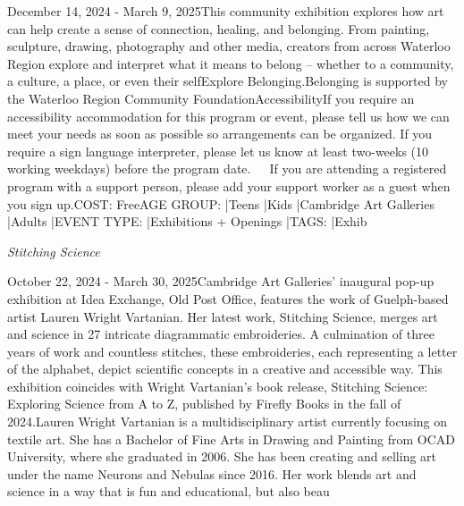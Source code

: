 \documentclass[letterpaper, 10pt]{article}
\newcommand{\subtitle}[1]{\textit{\large #1}\vspace{0.5em}}
\newcommand{\articlecontent}[1]{\small #1\vspace{1em}}
\begin{document}
\begin{multicols}{2}
{
\vspace{10px}

December 14, 2024 - March 9, 2025This community exhibition explores how art can help create a sense of connection, healing, and belonging. From painting, sculpture, drawing, photography and other media, creators from across Waterloo Region explore and interpret what it means to belong – whether to a community, a culture, a place, or even their selfExplore Belonging.Belonging is supported by the Waterloo Region Community FoundationAccessibilityIf you require an accessibility accommodation for this program or event, please tell us how we can meet your needs as soon as possible so arrangements can be organized. If you require a sign language interpreter, please let us know at least two-weeks (10 working weekdays) before the program date.   If you are attending a registered program with a support person, please add your support worker as a guest when you sign up.COST: FreeAGE GROUP: |Teens |Kids |Cambridge Art Galleries |Adults |EVENT TYPE: |Exhibitions + Openings |TAGS: |Exhib
}
\vspace{10px}

\subtitle{Stitching Science}

\articlecontent{

\qrcode[height=1.5cm]{https://ideaexchange.libnet.info/event/12110996}
\vspace{10px}

October 22, 2024 - March 30, 2025Cambridge Art Galleries' inaugural pop-up exhibition at Idea Exchange, Old Post Office, features the work of Guelph-based artist Lauren Wright Vartanian. Her latest work, Stitching Science, merges art and science in 27 intricate diagrammatic embroideries. A culmination of three years of work and countless stitches, these embroideries, each representing a letter of the alphabet, depict scientific concepts in a creative and accessible way. This exhibition coincides with Wright Vartanian’s book release, Stitching Science: Exploring Science from A to Z, published by Firefly Books in the fall of 2024.Lauren Wright Vartanian is a multidisciplinary artist currently focusing on textile art. She has a Bachelor of Fine Arts in Drawing and Painting from OCAD University, where she graduated in 2006. She has been creating and selling art under the name Neurons and Nebulas since 2016. Her work blends art and science in a way that is fun and educational, but also beau
}
\vspace{10px}


\end{multicols}
\end{document}
